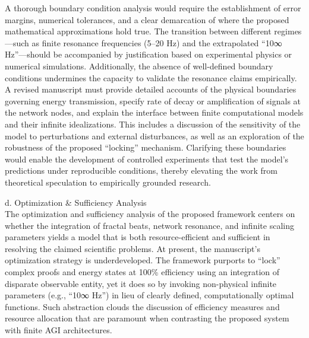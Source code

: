 \documentclass[12pt]{article}
\begin{document}
A thorough boundary condition analysis would require the establishment of error margins, numerical tolerances, and a clear demarcation of where the proposed mathematical approximations hold true. The transition between different regimes—such as finite resonance frequencies (5–20 Hz) and the extrapolated “10∞ Hz”—should be accompanied by justification based on experimental physics or numerical simulations. Additionally, the absence of well-defined boundary conditions undermines the capacity to validate the resonance claims empirically. A revised manuscript must provide detailed accounts of the physical boundaries governing energy transmission, specify rate of decay or amplification of signals at the network nodes, and explain the interface between finite computational models and their infinite idealizations. This includes a discussion of the sensitivity of the model to perturbations and external disturbances, as well as an exploration of the robustness of the proposed “locking” mechanism. Clarifying these boundaries would enable the development of controlled experiments that test the model’s predictions under reproducible conditions, thereby elevating the work from theoretical speculation to empirically grounded research.

d. Optimization \& Sufficiency Analysis \\
The optimization and sufficiency analysis of the proposed framework centers on whether the integration of fractal beats, network resonance, and infinite scaling parameters yields a model that is both resource-efficient and sufficient in resolving the claimed scientific problems. At present, the manuscript’s optimization strategy is underdeveloped. The framework purports to “lock” complex proofs and energy states at 100\% efficiency using an integration of disparate observable entity, yet it does so by invoking non-physical infinite parameters (e.g., “10∞ Hz”) in lieu of clearly defined, computationally optimal functions. Such abstraction clouds the discussion of efficiency measures and resource allocation that are paramount when contrasting the proposed system with finite AGI architectures. 
\end{document}
